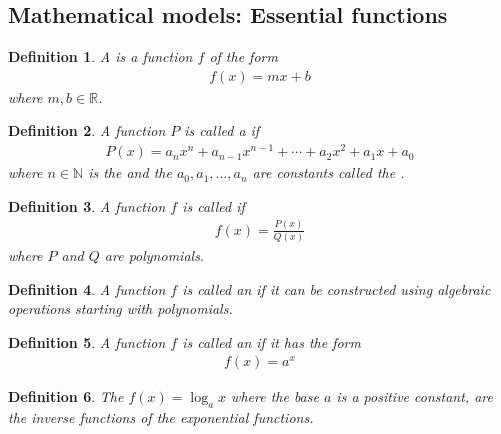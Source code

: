 \documentclass{article}
\theoremstyle{sltheorem}
\newtheorem{definition}{Definition}[section]
\newcommand{\R}{\mathbb{R}}
\newcommand{\N}{\mathbb{N}}
\begin{document}
\subsection{Mathematical models: Essential functions}
\begin{definition}
    A  is a function $f$ of the form
    \begin{align*}
        f(x) = mx + b
    \end{align*}
    where $m, b\in\R$.
\end{definition}
\begin{definition}
    A function $P$ is called a  if
    \begin{align*}
        P(x) = a_nx^n+a_{n-1}x^{n-1}+\cdots +a_2x^2 + a_1x+a_0
    \end{align*}
    where $n\in\N$ is the  and the $a_0, a_1, ..., a_n$ are constants called the .
\end{definition}
\begin{definition}
    A function $f$ is called  if
    \begin{align*}
        f(x) = \frac{P(x)}{Q(x)}
    \end{align*}
    where $P$ and $Q$ are polynomials.
\end{definition}
\begin{definition}
    A function $f$ is called an  if it can be constructed using algebraic operations starting with polynomials.
\end{definition}
\begin{definition}
    A function $f$ is called an  if it has the form
    \begin{align*}
        f(x) = a^x
    \end{align*}
\end{definition}
\begin{definition}
    The  $f(x) = \log_ax$ where the base $a$ is a positive constant, are the inverse functions of the exponential functions.
\end{definition}
\end{document}
